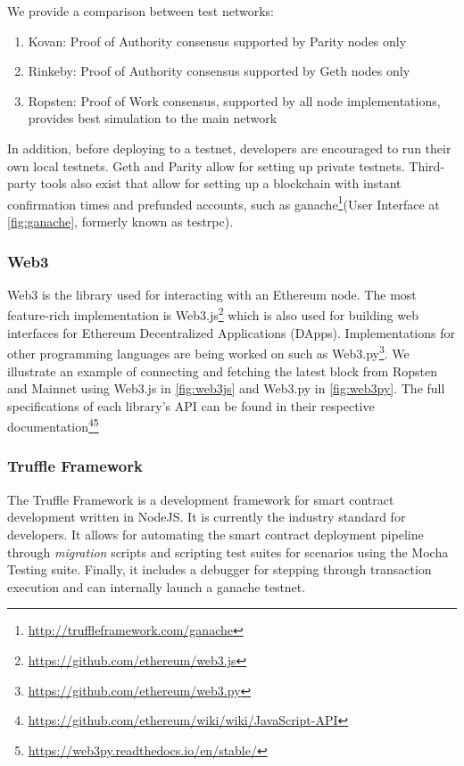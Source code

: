 We provide a comparison between test networks:
\begin{enumerate}
    \item Kovan: Proof of Authority consensus supported by Parity nodes only
    \item Rinkeby: Proof of Authority consensus supported by Geth nodes only
    \item Ropsten: Proof of Work consensus, supported by all node implementations, provides best simulation to the main network 
\end{enumerate}

In addition, before deploying to a testnet, developers are encouraged to run their own local testnets. Geth and Parity allow for setting up private testnets. Third-party tools also exist that allow for setting up a blockchain with instant confirmation times and prefunded accounts, such as ganache\footnote{\url{http://truffleframework.com/ganache}}(User Interface at \ref{fig:ganache},  formerly known as testrpc).


\subsubsection{Web3}
Web3 is the library used for interacting with an Ethereum node. The most feature-rich implementation is Web3.js\footnote{\url{https://github.com/ethereum/web3.js}} which is also used for building web interfaces for Ethereum Decentralized Applications (DApps). Implementations for other programming languages are being worked on such as Web3.py\footnote{\url{https://github.com/ethereum/web3.py}}. We illustrate an example of connecting and fetching the latest block from Ropsten and Mainnet using Web3.js in \ref{fig:web3js} and Web3.py in \ref{fig:web3py}. The full specifications of each library's API can be found in their respective documentation\footnote{\url{https://github.com/ethereum/wiki/wiki/JavaScript-API}}\footnote{\url{https://web3py.readthedocs.io/en/stable/}}


\subsubsection{Truffle Framework}
The Truffle Framework is a development framework for smart contract development written in NodeJS. It is currently the industry standard for developers. It allows for automating the smart contract deployment pipeline through \textit{migration} scripts and scripting test suites for scenarios using the Mocha Testing suite. Finally, it includes a debugger for stepping through transaction execution and can internally launch a ganache testnet.

